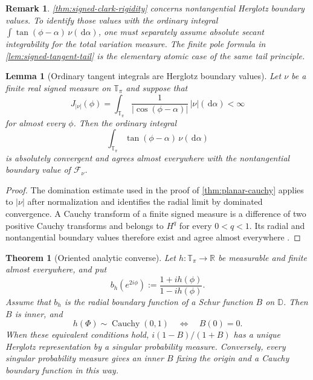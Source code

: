 \documentclass[11pt]{article}
\numberwithin{equation}{section}
\theoremstyle{thmstyleone}%
\newtheorem{theorem}{Theorem}[section]
\newtheorem{lemma}[lemma]{Lemma}
\theoremstyle{thmstyletwo}%
\newtheorem*{remark}{Remark}%
\let\cref\autoref
\newcommand{\R}{\mathbb R}
\newcommand{\D}{\mathbb D}
\newcommand{\dd}{\,\mathrm d}
\newcommand{\Cauchy}{\operatorname{Cauchy}}
\begin{document}
\begin{remark}
\cref{thm:signed-clark-rigidity} concerns nontangential Herglotz boundary
values.  To identify those values with the ordinary integral
\(\int\tan(\phi-\alpha)\,\nu(\dd\alpha)\), one must separately assume
absolute secant integrability for the total variation measure.  The finite
pole formula in \cref{lem:signed-tangent-tail} is the elementary atomic
case of the same tail principle.
\end{remark}

\begin{lemma}[Ordinary tangent integrals are Herglotz boundary values]
\label{lem:signed-ordinary-boundary}
Let \(\nu\) be a finite real signed measure on \(\mathbb T_\pi\) and suppose
that
\[
  J_{|\nu|}(\phi)
  =\int_{\mathbb T_\pi}
    \frac{1}{|\cos(\phi-\alpha)|}\,|\nu|(\dd\alpha)
  <\infty
\]
for almost every \(\phi\).  Then the ordinary integral
\[
  \int_{\mathbb T_\pi}\tan(\phi-\alpha)\,\nu(\dd\alpha)
\]
is absolutely convergent and agrees almost everywhere with the
nontangential boundary value of \(\mathcal F_\nu\).
\end{lemma}

\begin{proof}
The domination estimate used in the proof of \cref{thm:planar-cauchy}
applies to \(|\nu|\) after normalization and identifies the radial limit by
dominated convergence.  A Cauchy transform of a finite signed measure is a
difference of two positive Cauchy transforms and belongs to \(H^q\) for
every \(0<q<1\).  Its radial and nontangential boundary values therefore
exist and agree almost everywhere \cite{duren-1970,cima-matheson-ross-2006}.
\end{proof}

\begin{theorem}[Oriented analytic converse]
\label{thm:analytic-clark-converse}
Let \(h:\mathbb T_\pi\to\R\) be measurable and finite almost everywhere,
and put
\begin{equation}
  b_h(e^{2i\phi})
  :=
  \frac{1+ih(\phi)}{1-ih(\phi)}.
  \label{eq:boundary-cayley}
\end{equation}
Assume that \(b_h\) is the radial boundary function of a Schur function
\(B\) on \(\D\).  Then \(B\) is inner, and
\[
  h(\Phi)\sim\Cauchy(0,1)
  \quad\Longleftrightarrow\quad
  B(0)=0.
\]
When these equivalent conditions hold, \(i(1-B)/(1+B)\) has a unique Herglotz
representation by a singular probability measure.  Conversely, every
singular probability measure gives an inner \(B\) fixing the origin and a
Cauchy boundary function in this way.
\end{theorem}
\end{document}
